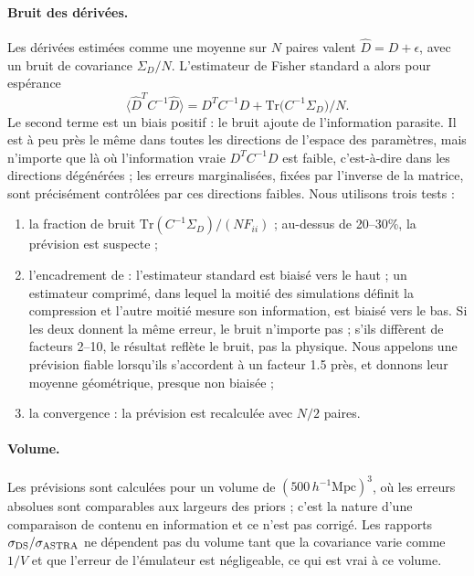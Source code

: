 \documentclass[11pt,twocolumn]{article}
\newcommand{\Mpch}{\,h^{-1}\mathrm{Mpc}}
\begin{document}
\paragraph{Bruit des dérivées.} Les dérivées estimées comme une moyenne sur $N$ paires valent $\hat D = D + \epsilon$, avec un bruit de covariance $\Sigma_D/N$. L'estimateur de Fisher standard a alors pour espérance
\begin{equation}
\langle \hat D^T C^{-1}\hat D\rangle = D^T C^{-1} D + \mathrm{Tr}\big(C^{-1}\Sigma_D\big)/N .
\end{equation}
Le second terme est un biais positif : le bruit ajoute de l'information parasite. Il est à peu près le même dans toutes les directions de l'espace des paramètres, mais n'importe que là où l'information vraie $D^TC^{-1}D$ est faible, c'est-à-dire dans les directions dégénérées ; les erreurs marginalisées, fixées par l'inverse de la matrice, sont précisément contrôlées par ces directions faibles. Nous utilisons trois tests :
\begin{enumerate}
\item la fraction de bruit $\mathrm{Tr}(C^{-1}\Sigma_D)/(N F_{ii})$ ; au-dessus de 20--30\%, la prévision est suspecte ;
\item l'encadrement de \cite{CoultonWandelt2023} : l'estimateur standard est biaisé vers le haut ; un estimateur comprimé, dans lequel la moitié des simulations définit la compression et l'autre moitié mesure son information, est biaisé vers le bas. Si les deux donnent la même erreur, le bruit n'importe pas ; s'ils diffèrent de facteurs 2--10, le résultat reflète le bruit, pas la physique. Nous appelons une prévision fiable lorsqu'ils s'accordent à un facteur 1.5 près, et donnons leur moyenne géométrique, presque non biaisée ;
\item la convergence : la prévision est recalculée avec $N/2$ paires.
\end{enumerate}

\paragraph{Volume.} Les prévisions sont calculées pour un volume de $(500\Mpch)^3$, où les erreurs absolues sont comparables aux largeurs des priors ; c'est la nature d'une comparaison de contenu en information et ce n'est pas corrigé. Les rapports $\sigma_{\rm DS}/\sigma_{\rm ASTRA}$ ne dépendent pas du volume tant que la covariance varie comme $1/V$ et que l'erreur de l'émulateur est négligeable, ce qui est vrai à ce volume.
\end{document}
